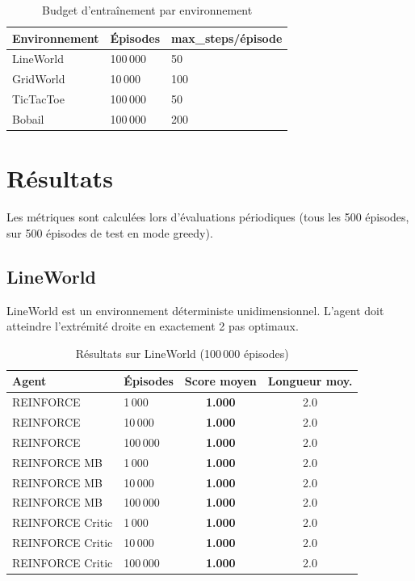 \documentclass[12pt,a4paper]{article}
\begin{document}
\begin{table}[H]
\centering
\caption{Budget d'entraînement par environnement}
\begin{tabular}{lll}
\toprule
\textbf{Environnement} & \textbf{Épisodes} & \textbf{max\_steps/épisode} \\
\midrule
LineWorld  & 100\,000 & 50  \\
GridWorld  & 10\,000  & 100 \\
TicTacToe  & 100\,000 & 50  \\
Bobail     & 100\,000 & 200 \\
\bottomrule
\end{tabular}
\end{table}

\section{Résultats}

Les métriques sont calculées lors d'évaluations périodiques (tous les 500 épisodes, sur 500 épisodes de test en mode greedy).

\subsection{LineWorld}

LineWorld est un environnement déterministe unidimensionnel. L'agent doit atteindre l'extrémité droite en exactement 2 pas optimaux.

\begin{table}[H]
\centering
\caption{Résultats sur LineWorld (100\,000 épisodes)}
\begin{tabular}{llcc}
\toprule
\textbf{Agent} & \textbf{Épisodes} & \textbf{Score moyen} & \textbf{Longueur moy.} \\
\midrule
REINFORCE        & 1\,000   & \textbf{1.000} & 2.0 \\
REINFORCE        & 10\,000  & \textbf{1.000} & 2.0 \\
REINFORCE        & 100\,000 & \textbf{1.000} & 2.0 \\
\midrule
REINFORCE MB     & 1\,000   & \textbf{1.000} & 2.0 \\
REINFORCE MB     & 10\,000  & \textbf{1.000} & 2.0 \\
REINFORCE MB     & 100\,000 & \textbf{1.000} & 2.0 \\
\midrule
REINFORCE Critic & 1\,000   & \textbf{1.000} & 2.0 \\
REINFORCE Critic & 10\,000  & \textbf{1.000} & 2.0 \\
REINFORCE Critic & 100\,000 & \textbf{1.000} & 2.0 \\
\bottomrule
\end{tabular}
\end{table}
\end{document}
